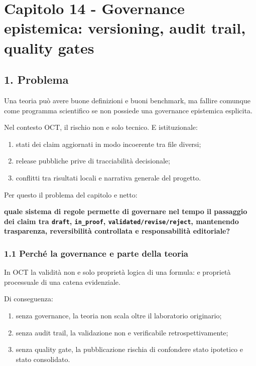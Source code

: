 \chapter{Capitolo 14 - Governance epistemica: versioning, audit trail, quality gates}

\section{1. Problema}

Una teoria può avere buone definizioni e buoni benchmark, ma fallire comunque come programma scientifico se non possiede una governance epistemica esplicita.

Nel contesto OCT, il rischio non e solo tecnico. E istituzionale:

\begin{enumerate}
\def\labelenumi{\arabic{enumi}.}
\tightlist
\item
  stati dei claim aggiornati in modo incoerente tra file diversi;
\item
  release pubbliche prive di tracciabilità decisionale;
\item
  conflitti tra risultati locali e narrativa generale del progetto.
\end{enumerate}

Per questo il problema del capitolo e netto:

\textbf{quale sistema di regole permette di governare nel tempo il passaggio dei claim tra \texttt{draft}, \texttt{in\_proof}, \texttt{validated/revise/reject}, mantenendo trasparenza, reversibilità controllata e responsabilità editoriale?}

\subsection{1.1 Perché la governance e parte della teoria}

In OCT la validità non e solo proprietà logica di una formula: e proprietà processuale di una catena evidenziale.

Di conseguenza:

\begin{enumerate}
\def\labelenumi{\arabic{enumi}.}
\tightlist
\item
  senza governance, la teoria non scala oltre il laboratorio originario;
\item
  senza audit trail, la validazione non e verificabile retrospettivamente;
\item
  senza quality gate, la pubblicazione rischia di confondere stato ipotetico e stato consolidato.
\end{enumerate}


